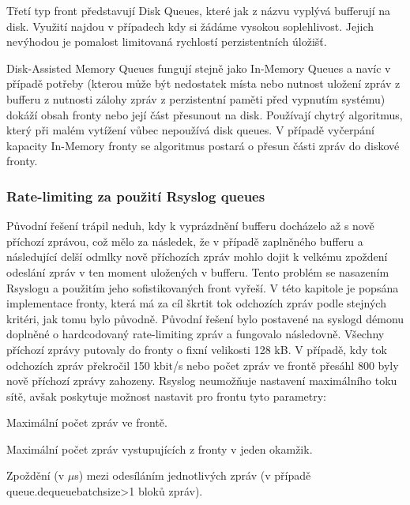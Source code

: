 \documentclass[thesis=B,czech]{FITthesis}[2012/06/26]
\begin{document}
Třetí typ front představují Disk Queues, které jak z názvu vyplývá bufferují na disk. Využití najdou v případech kdy si žádáme vysokou soplehlivost. Jejich nevýhodou je pomalost limitovaná rychlostí perzistentních úložišť.

Disk-Assisted Memory Queues fungují stejně jako In-Memory Queues a navíc v případě potřeby (kterou může být nedostatek místa nebo nutnost uložení zpráv z bufferu z nutnosti zálohy zpráv z perzistentní paměti před vypnutím systému) dokáží obsah fronty nebo její část přesunout na disk. Používají chytrý algoritmus, který při malém vytížení vůbec nepoužívá disk queues. V případě vyčerpání kapacity In-Memory fronty se algoritmus postará o přesun části zpráv do diskové fronty.

\subsubsection*{Rate-limiting za použití Rsyslog queues}
Původní řešení trápil neduh, kdy k vyprázdnění bufferu docházelo až s nově příchozí zprávou, což mělo za následek, že v případě zaplněného bufferu a následující delší odmlky nově příchozích zpráv mohlo dojit k velkému zpoždení odeslání zpráv v ten moment uložených v bufferu. Tento problém se nasazením Rsyslogu a použitím jeho sofistikovaných front vyřeší.
V této kapitole je popsána implementace fronty, která má za cíl škrtit tok odchozích zpráv podle stejných kritéri, jak tomu bylo původně.
Původní řešení bylo postavené na syslogd démonu doplněné o hardcodovaný rate-limiting zpráv a fungovalo následovně. Všechny příchozí zprávy putovaly do fronty o fixní velikosti 128 kB. V případě, kdy tok odchozích zpráv překročil 150 kbit/s nebo počet zpráv ve frontě přesáhl 800 byly nově příchozí zprávy zahozeny.
Rsyslog neumožňuje nastavení maximálního toku sítě, avšak poskytuje možnost nastavit pro frontu tyto parametry:
\begin{description}
  \setlength\itemsep{-1ex}
  \item [queue.size:] Maximální počet zpráv ve frontě.
  \item [queue.dequeuebatchsize:] Maximální počet zpráv vystupujících z fronty v jeden okamžik.
  \item [queue.dequeueslowdown:] Zpoždění (v $\mu$s) mezi odesíláním jednotlivých zpráv (v případě queue.dequeuebatchsize>1 bloků zpráv).
\end{description}
\end{document}
